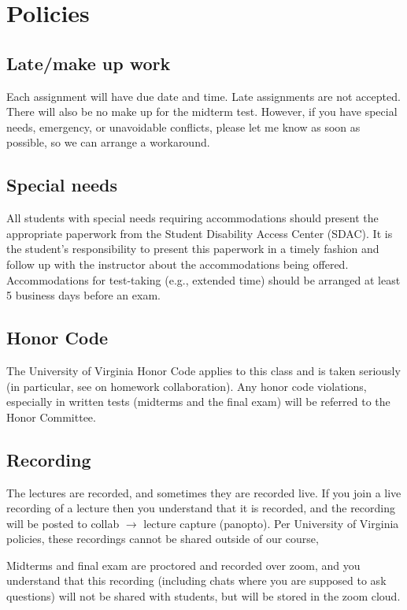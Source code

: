 \documentclass[oneside,11pt]{amsart}
\begin{document}
\section{Policies}

\subsection{Late/make up work} Each assignment will have due date and time.
Late assignments are not accepted. There will also be no make up for the midterm test.
However, if you have special needs, emergency, or unavoidable conflicts, please
let me know as soon as possible, so we can arrange a workaround.

\subsection{Special needs}

All students with special needs requiring accommodations should present the
appropriate paperwork from the Student Disability Access Center (SDAC). It is
the student's responsibility to present this paperwork in a timely fashion and
follow up with the instructor about the accommodations being offered.
Accommodations for test-taking (e.g., extended time) should be arranged at
least 5 business days before an exam.

\subsection{Honor Code} The University of Virginia Honor Code applies to this
class and is taken seriously (in particular, 
see  on homework collaboration).
Any honor code violations,
especially in written tests (midterms and the final exam)
will be referred to the
Honor Committee.

\subsection{Recording}

The lectures are recorded, and sometimes they are recorded live. 
If you join a live recording of a lecture then you understand that it is
recorded, and the recording will be posted to collab $\to$ lecture capture (panopto).
Per University of Virginia
policies,
these recordings cannot be shared outside of our course, 

Midterms and final exam are proctored and recorded over zoom, and 
you understand that this recording (including chats where you are supposed to ask questions)
will not be shared with students, but will be stored in the zoom cloud.
\end{document}
